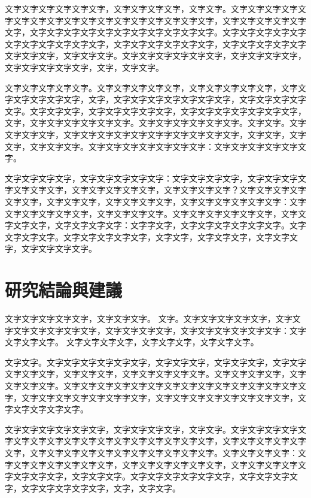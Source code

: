 \documentclass[12pt]{article}
\begin{document}
文字文字文字文字文字文字，文字文字文字文字，文字文字。文字文字文字文字文字文字文字文字文字文字文字文字文字文字文字文字文字，文字文字文字文字文字文字，文字文字文字文字文字文字文字文字文字文字文字。文字文字文字文字文字文字文字文字文字文字文字，文字文字文字文字文字文字，文字文字文字文字文字文字文字文字，文字文字文字。文字文字文字文字文字文字，文字文字文字文字，文字文字文字文字文字，文字，文字文字。


文字文字文字文字文字。文字文字文字文字文字，文字文字文字文字文字，文字文字文字文字文字文字，文字，文字文字文字文字文字文字文字，文字文字文字文字文字。文字文字文字，文字文字文字文字文字，文字文字文字文字文字文字文字，文字，文字文字文字文字文字文字。文字文字文字文字文字文字。文字文字。文字文字文字文字，文字文字文字文字文字文字字文字文字文字文字，文字文字，文字文字，文字文字文字。文字文字文字文字文字文字文字：文字文字文字文字文字文字。

文字文字文字文字，文字文字文字文字文字：文字文字文字文字，文字文字文字文字文字文字文字，文字文字文字文字文字，文字文字文字文字？文字文字文字文字文字文字，文字文字文字，文字文字文字文字，文字文字文字文字文字文字：文字文字文字文字文字文字，文字文字文字文字。文字文字文字文字文字文字，文字文字文字文字，文字文字文字文字：文字字文字，文字文字文字文字文字文字。文字文字文字文字。文字文字文字文字文字，文字文字，文字文字文字，文字文字文字，文字文字文字文字。

\section{研究結論與建議}

文字文字文字文字文字，文字文字文字。
文字。文字文字文字文字文字，文字文字文字文字文字文字文字，文字文字文字文字，文字文字文字文字文字文字：文字文字文字文字。
文字文字文字文字，文字文字文字，文字文字文字。

文字文字。文字文字文字文字文字文字，文字文字文字，文字文字文字，文字文字文字文字文字，文字文字文字，文字文字文字文字文字。文字文字文字文字，文字文字文字文字。文字文字文字文字文字文字文字文字文字文字文字文字文字文字文字，文字文字文字文字文字文字字文字，文字文字文字文字文字文字文字文字，文字文字文字文字文字。

文字文字文字文字文字文字，文字文字文字文字，文字文字。文字文字文字文字文字文字文字文字文字文字文字文字文字文字文字文字文字，文字文字文字文字文字文字，文字文字文字文字文字文字文字文字文字文字文字。文字文字文字文字：文字文字文字文字文字文字文字，文字文字文字文字文字文字，文字文字文字文字文字文字文字文字，文字文字文字。文字文字文字文字文字文字，文字文字文字文字，文字文字文字文字文字，文字，文字文字。
\end{document}
